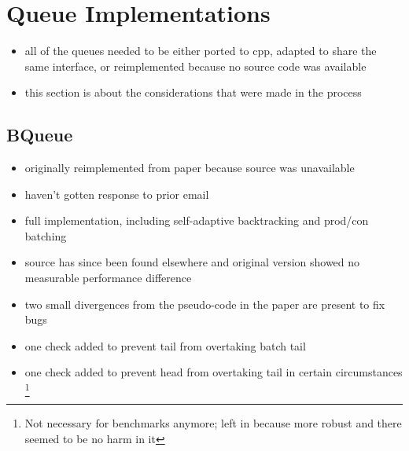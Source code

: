 \section{Queue Implementations}
\begin{itemize}
    \item all of the queues needed to be either ported to cpp, adapted to share the same interface, or reimplemented because no source code was available
    \item this section is about the considerations that were made in the process
\end{itemize}

\subsection{BQueue}
\begin{itemize}
    \item originally reimplemented from paper because source was unavailable
    \item haven't gotten response to prior email
    \item full implementation, including self-adaptive backtracking and prod/con batching
    \item source has since been found elsewhere and original version showed no measurable performance difference
    \item two small divergences from the pseudo-code in the paper are present to fix bugs
    \item one check added to prevent tail from overtaking batch tail
    \item one check added to prevent head from overtaking tail in certain circumstances
          \footnote{Not necessary for benchmarks anymore; left in because more robust and there seemed to be no harm in it}
\end{itemize}

